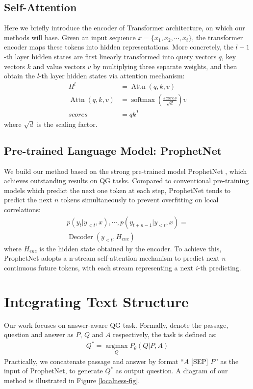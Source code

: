 \documentclass[11pt]{article}
\begin{document}
\subsection{Self-Attention}
Here we briefly introduce the encoder of Transformer architecture, on which our methods will base.
Given an input sequence $x = \{x_1, x_2, \cdots, x_t\}$, the transformer encoder maps these tokens into hidden representations. More concretely, the $l-1$-th layer hidden states are first linearly transformed into query vectors $q$, key vectors $k$ and value vectors $v$ by multiplying three separate weights,
and then obtain the $l$-th layer hidden states via attention mechanism:
\begin{align}
    H^l &= \operatorname{Attn}(q, k, v) \\
    \operatorname{Attn}(q, k, v) &= \operatorname{softmax} (\frac{scores}{\sqrt{d}})v \\
    scores &= qk^T
\end{align}
where $\sqrt{d}$ is the scaling factor.





\subsection{Pre-trained Language Model: ProphetNet}
We build our method based on the strong pre-trained model ProphetNet \citep{qi-etal-2020-prophetnet}, which achieves outstanding results on QG tasks. Compared to conventional pre-training models which predict the next one token at each step, ProphetNet tends to predict the next $n$ tokens simultaneously to prevent overfitting on local correlations:
\begin{multline} \label{prophetnet-predict} 
    p(y_t|y_{<t}, x), \cdots, p(y_{t+n-1}|y_{<t},x) = \\ \operatorname{Decoder} (y_{<t}, H_{enc})
\end{multline}
where $H_{enc}$ is the hidden state obtained by the encoder. To achieve this, ProphetNet adopts a n-stream self-attention mechanism to predict next $n$ continuous future tokens, with each stream representing a next $i$-th predicting. 


\section{Integrating Text Structure}

Our work focuses on answer-aware QG task. Formally,
denote the passage, question and answer as $P$, $Q$ and $A$ respectively, the task is defined as:
\begin{align}
    Q^* = \operatorname*{argmax}_{Q} P_{\theta} (Q|P, A)
\end{align}
Practically, we concatenate passage and answer by format ``$A$ [SEP] $P$'' as the input of ProphetNet, to generate $Q^*$ as output question. A diagram of our method is illustrated in Figure \ref{localness-fig}.
\end{document}

